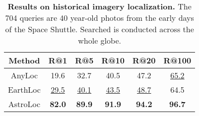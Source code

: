 
\begin{table}
\begin{center}
\begin{adjustbox}{width=0.8\columnwidth}
\begin{tabular}{c|ccccc}
\toprule
Method & R@1 & R@5 & R@10 & R@20 & R@100 \\
\midrule
AnyLoc   & 19.6 & 32.7 & 40.5 & 47.2 & \underline{65.2} \\
EarthLoc & \underline{29.5} & \underline{40.1} & \underline{43.5} & \underline{48.7} & 64.5 \\
AstroLoc & \textbf{82.0} & \textbf{89.9} & \textbf{91.9} & \textbf{94.2} & \textbf{96.7} \\
\bottomrule
\end{tabular}
\end{adjustbox}
\end{center}
\vspace{-5mm}
\caption{\textbf{Results on historical imagery localization.} The 704 queries are 40 year-old photos from the early days of the Space Shuttle. Searched is conducted across the whole globe.}
\vspace{-2mm}
\label{tab:sshuttle}
\end{table}

